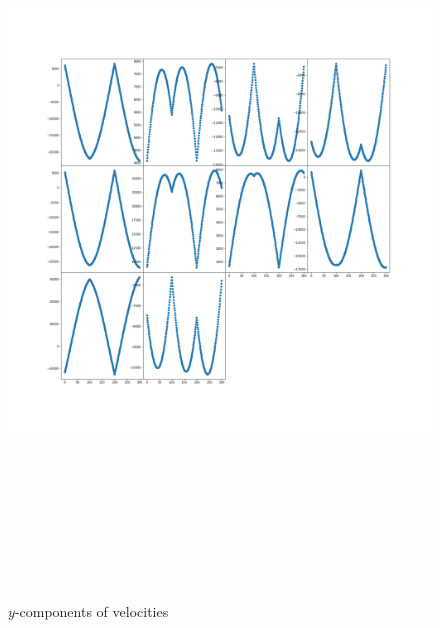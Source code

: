 \documentclass[12pt]{article}
\begin{document}
	\begin{figure}[H]
		\includegraphics[width=\linewidth, height=20cm]{subvsy3Bz.png} \caption{$y$-components of velocities} \label{subvsy3Bz}
	\end{figure}
\end{document}

